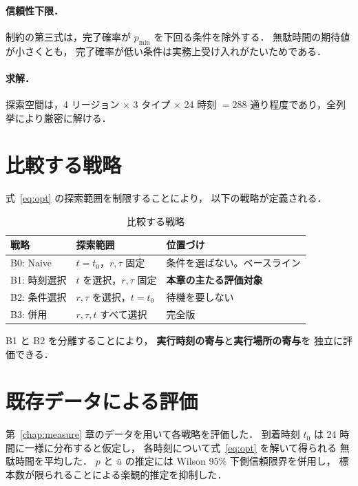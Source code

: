 \documentclass[11pt,a4paper]{ltjsreport}
\begin{document}
\paragraph{信頼性下限．}
制約の第三式は，完了確率が $p_{\min}$ を下回る条件を除外する．
無駄時間の期待値が小さくとも，
完了確率が低い条件は実務上受け入れがたいためである．

\paragraph{求解．}
探索空間は，4 リージョン $\times$ 3 タイプ $\times$ 24 時刻
$= 288$ 通り程度であり，全列挙により厳密に解ける．

\section{比較する戦略}
\label{sec:strategies}

式~\eqref{eq:opt} の探索範囲を制限することにより，
以下の戦略が定義される．

\begin{table}[htbp]
\centering
\caption{比較する戦略}
\label{tab:strategies}
\small
\begin{tabularx}{\textwidth}{@{}llX@{}}
\toprule
戦略 & 探索範囲 & 位置づけ \\
\midrule
B0: Naive
  & $t = t_0$，$r,\tau$ 固定
  & 条件を選ばない。ベースライン \\
\addlinespace
B1: 時刻選択
  & $t$ を選択，$r,\tau$ 固定
  & \textbf{本章の主たる評価対象} \\
\addlinespace
B2: 条件選択
  & $r,\tau$ を選択，$t = t_0$
  & 待機を要しない \\
\addlinespace
B3: 併用
  & $r,\tau,t$ すべて選択
  & 完全版 \\
\bottomrule
\end{tabularx}
\end{table}

B1 と B2 を分離することにより，
\textbf{実行時刻の寄与}と\textbf{実行場所の寄与}を
独立に評価できる．

\section{既存データによる評価}
\label{sec:eval}

第~\ref{chap:measure} 章のデータを用いて各戦略を評価した．
到着時刻 $t_0$ は 24 時間に一様に分布すると仮定し，
各時刻について式~\eqref{eq:opt} を解いて得られる
無駄時間を平均した．
$p$ と $\bar u$ の推定には Wilson 95\% 下側信頼限界を併用し，
標本数が限られることによる楽観的推定を抑制した．
\end{document}
